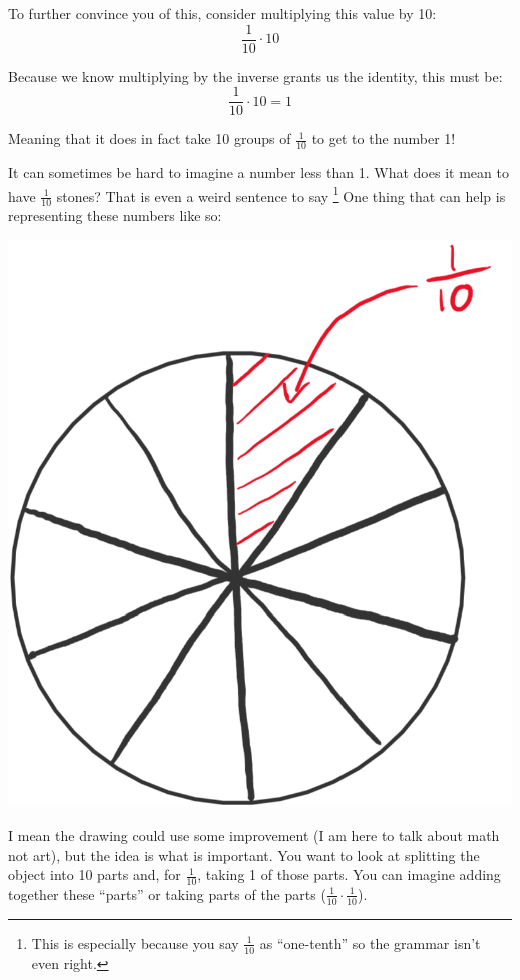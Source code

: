 \documentclass{article}
\begin{document}
To further convince you of this, consider multiplying this value by 10: 
\[ \frac{1}{10} \cdot 10 \]

Because we know multiplying by the inverse grants us the identity, this must be: 
\[ \frac{1}{10} \cdot 10 = 1 \]

Meaning that it does in fact take 10 groups of $\frac{1}{10}$ to get to the number 1! 

It can sometimes be hard to imagine a number less than 1. What does it mean to have $\frac{1}{10}$ stones? That is even a weird sentence to say \footnote{This is especially because you say $\frac{1}{10}$ as ``one-tenth'' so the grammar isn't even right.} One thing that can help is representing these numbers like so: 
\begin{center}
    \includegraphics[scale=0.5]{chapter5_draw1.png}
\end{center}

I mean the drawing could use some improvement (I am here to talk about math not art), but the idea is what is important. You want to look at splitting the object into 10 parts and, for $\frac{1}{10}$, taking 1 of those parts. You can imagine adding together these ``parts'' or taking parts of the parts ($\frac{1}{10} \cdot \frac{1}{10}$).
\end{document}
